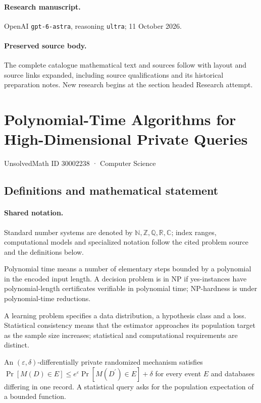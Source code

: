 \documentclass[11pt]{article}
\begin{document}
\paragraph{Research manuscript.} OpenAI \texttt{gpt-6-astra}, reasoning \texttt{ultra}; 11 October 2026.
\paragraph{Preserved source body.} The complete catalogue mathematical text and sources follow with layout and source links expanded, including source qualifications and its historical preparation notes. New research begins at the section headed Research attempt.

\section{Polynomial-Time Algorithms for High-Dimensional Private Queries}\label{30002238}
{\small UnsolvedMath ID 30002238 · Computer Science}
\subsection{Definitions and mathematical statement}

\paragraph{Shared notation.}Standard number systems are denoted by $\mathbb N,\mathbb Z,\mathbb Q,\mathbb R,\mathbb C$; index ranges, computational models and specialized notation follow the cited problem source and the definitions below.


Polynomial time means a number of elementary steps bounded by a polynomial in the encoded input length. A decision problem is in $\mathrm{NP}$ if yes-instances have polynomial-length certificates verifiable in polynomial time; NP-hardness is under polynomial-time reductions.

A learning problem specifies a data distribution, a hypothesis class and a loss. Statistical consistency means that the estimator approaches its population target as the sample size increases; statistical and computational requirements are distinct.

An $(\varepsilon,\delta)$-differentially private randomized mechanism satisfies $\Pr[M(D)\in E]\leq e^\varepsilon\Pr[M(D^{\prime})\in E]+\delta$ for every event $E$ and databases differing in one record. A statistical query asks for the population expectation of a bounded function.
\end{document}
